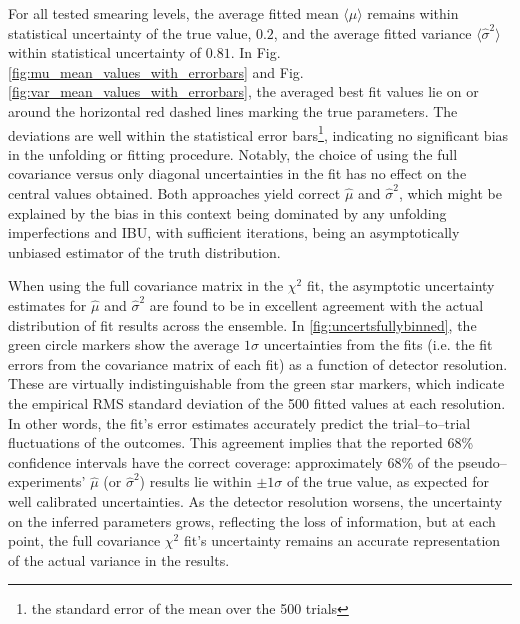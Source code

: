             For all tested smearing levels, the average fitted mean $\langle \hat{\mu}\rangle$ remains within statistical uncertainty of the true value, \(0.2\), and the average fitted variance $\langle \hat{\sigma}^2\rangle$ within statistical uncertainty of \(0.81\).
            In Fig.\ref{fig:mu_mean_values_with_errorbars} and Fig.\ref{fig:var_mean_values_with_errorbars}, the averaged best fit values lie on or around the horizontal red dashed lines marking the true parameters.
            The deviations are well within the statistical error bars\footnote{the standard error of the mean over the 500 trials}, indicating no significant bias in the unfolding or fitting procedure.
            Notably, the choice of using the full covariance versus only diagonal uncertainties in the fit has no effect on the central values obtained.
            Both approaches yield correct $\hat{\mu}$ and $\hat{\sigma}^2$, which might be explained by the bias in this context being dominated by any unfolding imperfections and IBU, with sufficient iterations, being an asymptotically unbiased estimator of the truth distribution.
    
            When using the full covariance matrix in the $\chi^2$ fit, the asymptotic uncertainty estimates for $\hat{\mu}$ and $\hat{\sigma}^2$ are found to be in excellent agreement with the actual distribution of fit results across the ensemble.
            In \cref{fig:uncertsfullybinned}, the green circle markers show the average $1\sigma$ uncertainties from the fits (i.e. the fit errors from the covariance matrix of each fit) as a function of detector resolution.
            These are virtually indistinguishable from the green star markers, which indicate the empirical RMS standard deviation of the 500 fitted values at each resolution.
            In other words, the fit’s error estimates accurately predict the trial--to--trial fluctuations of the outcomes.
            This agreement implies that the reported 68\% confidence intervals have the correct coverage:
            approximately 68\% of the pseudo--experiments' $\hat{\mu}$ (or $\hat{\sigma}^2$) results lie within $\pm1\sigma$ of the true value, as expected for well calibrated uncertainties.
            As the detector resolution worsens, the uncertainty on the inferred parameters grows, reflecting the loss of information, but at each point, the full covariance \(\chi^2\) fit's uncertainty remains an accurate representation of the actual variance in the results.
    
